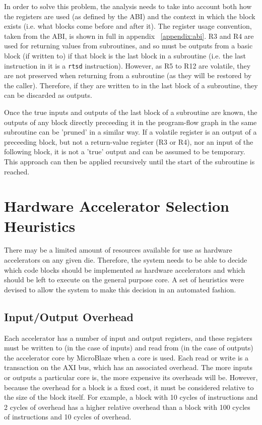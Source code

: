 \documentclass{UoYCSproject}
\begin{document}
In order to solve this problem, the analysis needs to take into account both how the registers are used (as defined by the
ABI) and the context in which the block exists (i.e. what blocks come before and after it).
The register usage convention, taken from the ABI, is shown in full in appendix ~\ref{appendix:abi}. R3 and R4 are used for
returning values from
subroutines, and so must be outputs from a basic block (if written to) if that block is the last block in a subroutine
(i.e. the last instruction in it is a \texttt{rtsd} instruction). However, as R5 to R12 are volatile, they are not preserved
when returning from a subroutine (as they will be restored by the caller). Therefore, if they are written to in the last block
of a subroutine, they can be discarded as outputs.

Once the true inputs and outputs of the last block of a subroutine are known, the outputs of any block directly preceeding it in
the program-flow graph in the same subroutine can be 'pruned' in a similar way. If a volatile register is an output of a
preceeding block, but not a return-value register (R3 or R4), nor an input of the following block, it is not a 'true' output and
can be assumed to be temporary. This approach can then be applied recursively until the start of the subroutine is reached.

\section{Hardware Accelerator Selection Heuristics}

There may be a limited amount of resources available for use as hardware accelerators on any given die. Therefore,
the system needs to be able to decide which code blocks should be implemented as hardware accelerators and which
should be left to execute on the general purpose core. A set of heuristics were devised to allow
the system to make this decision in an automated fashion.

\subsection{Input/Output Overhead}

Each accelerator has a number of input and output registers, and these registers must be written to (in the case of inputs)
and read from (in the case of outputs) the accelerator core by MicroBlaze when a core is used. Each read or write is a transaction
on the AXI bus, which has an associated overhead. The more inputs or outputs a particular core is, the more expensive its
overheads will be. However, because the overhead for a block is a fixed cost, it must be considered relative to the size of the
block itself. For example, a block with 10 cycles of instructions and 2 cycles of overhead has a higher relative overhead
than a block with 100 cycles of instructions and 10 cycles of overhead.
\end{document}
